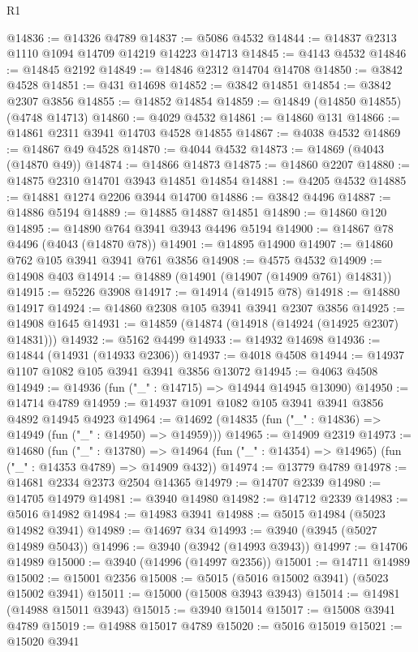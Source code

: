 \begin{lexlean}{R1}
\begin{coremodule}
@14836 := @14326 @4789
@14837 := @5086 @4532
@14844 := @14837 @2313 @1110 @1094 @14709 @14219 @14223 @14713
@14845 := @4143 @4532
@14846 := @14845 @2192
@14849 := @14846 @2312 @14704 @14708
@14850 := @3842 @4528
@14851 := @431 @14698
@14852 := @3842 @14851
@14854 := @3842 @2307 @3856
@14855 := @14852 @14854
@14859 := @14849 (@14850 @14855) (@4748 @14713)
@14860 := @4029 @4532
@14861 := @14860 @131
@14866 := @14861 @2311 @3941 @14703 @4528 @14855
@14867 := @4038 @4532
@14869 := @14867 @49 @4528
@14870 := @4044 @4532
@14873 := @14869 (@4043 (@14870 @49))
@14874 := @14866 @14873
@14875 := @14860 @2207
@14880 := @14875 @2310 @14701 @3943 @14851 @14854
@14881 := @4205 @4532
@14885 := @14881 @1274 @2206 @3944 @14700
@14886 := @3842 @4496
@14887 := @14886 @5194
@14889 := @14885 @14887 @14851
@14890 := @14860 @120
@14895 := @14890 @764 @3941 @3943 @4496 @5194
@14900 := @14867 @78 @4496 (@4043 (@14870 @78))
@14901 := @14895 @14900
@14907 := @14860 @762 @105 @3941 @3941 @761 @3856
@14908 := @4575 @4532
@14909 := @14908 @403
@14914 := @14889 (@14901 (@14907 (@14909 @761) @14831))
@14915 := @5226 @3908
@14917 := @14914 (@14915 @78)
@14918 := @14880 @14917
@14924 := @14860 @2308 @105 @3941 @3941 @2307 @3856
@14925 := @14908 @1645
@14931 := @14859 (@14874 (@14918 (@14924 (@14925 @2307) @14831)))
@14932 := @5162 @4499
@14933 := @14932 @14698
@14936 := @14844 (@14931 (@14933 @2306))
@14937 := @4018 @4508
@14944 := @14937 @1107 @1082 @105 @3941 @3941 @3856 @13072
@14945 := @4063 @4508
@14949 := @14936 (fun ("_" : @14715) => @14944 @14945 @13090)
@14950 := @14714 @4789
@14959 := @14937 @1091 @1082 @105 @3941 @3941 @3856 @4892 @14945 @4923
@14964 := @14692 (@14835 (fun ("_" : @14836) => @14949 (fun ("_" : @14950) => @14959)))
@14965 := @14909 @2319
@14973 := @14680
    (fun ("_" : @13780) =>
    @14964 (fun ("_" : @14354) => @14965) (fun ("_" : @14353 @4789) => @14909 @432))
@14974 := @13779 @4789
@14978 := @14681 @2334 @2373 @2504 @14365
@14979 := @14707 @2339
@14980 := @14705 @14979
@14981 := @3940 @14980
@14982 := @14712 @2339
@14983 := @5016 @14982
@14984 := @14983 @3941
@14988 := @5015 @14984 (@5023 @14982 @3941)
@14989 := @14697 @34
@14993 := @3940 (@3945 (@5027 @14989 @5043))
@14996 := @3940 (@3942 (@14993 @3943))
@14997 := @14706 @14989
@15000 := @3940 (@14996 (@14997 @2356))
@15001 := @14711 @14989
@15002 := @15001 @2356
@15008 := @5015 (@5016 @15002 @3941) (@5023 @15002 @3941)
@15011 := @15000 (@15008 @3943 @3943)
@15014 := @14981 (@14988 @15011 @3943)
@15015 := @3940 @15014
@15017 := @15008 @3941 @4789
@15019 := @14988 @15017 @4789
@15020 := @5016 @15019
@15021 := @15020 @3941

\end{coremodule}
\end{lexlean}

